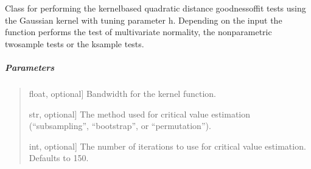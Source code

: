 \documentclass[letterpaper,10pt,english,openany,oneside]{sphinxmanual}
\begin{document}
\begin{fulllineitems}
\label{\detokenize{api_reference/generated/QuadratiK.kernel_test.KernelTest:QuadratiK.kernel_test.KernelTest}}
\pysigstartsignatures
{}
\pysigstopsignatures
\sphinxAtStartPar
Class for performing the kernel\sphinxhyphen{}based quadratic distance goodness\sphinxhyphen{}of\sphinxhyphen{}fit tests using 
the Gaussian kernel with tuning parameter h. Depending on the input  the function performs
the test of multivariate normality, the non\sphinxhyphen{}parametric two\sphinxhyphen{}sample tests or the k\sphinxhyphen{}sample tests.


\subparagraph{Parameters}
\label{\detokenize{api_reference/generated/QuadratiK.kernel_test.KernelTest:parameters}}\begin{quote}
\begin{description}
\sphinxlineitem{h}{[}float, optional{]}
\sphinxAtStartPar
Bandwidth for the kernel function.

\sphinxlineitem{method}{[}str, optional{]}
\sphinxAtStartPar
The method used for critical value estimation (“subsampling”, “bootstrap”, 
or “permutation”).

\sphinxlineitem{num\_iter}{[}int, optional{]}
\sphinxAtStartPar
The number of iterations to use for critical value estimation. Defaults to 150.


\end{description}
\end{quote}
\end{fulllineitems}
\end{document}
